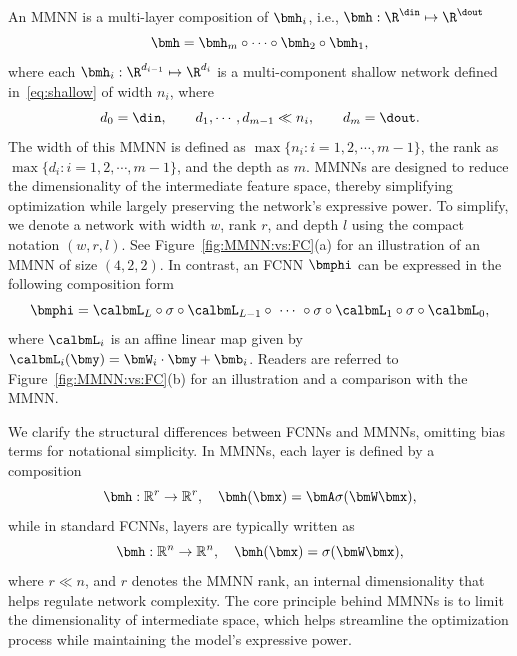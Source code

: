 \documentclass[review,hidelinks,onefignum,onetabnum]{siamart250211}
\begin{document}



An MMNN is a multi-layer composition of $\bmh_i$, i.e., $\bmh:\R^\din \mapsto\R^\dout$
\begin{equation*}
    \bmh=\bmh_m\circ \cdots \circ \bmh_2\circ \bmh_1,
\end{equation*}
where each $\bmh_i:\R^{d_{i-1}}\mapsto\R^{d_{i}}$ is a multi-component shallow network defined in~\eqref{eq:shallow} of width $n_i$, where 
\begin{equation*}
    d_0=\din,\qquad d_1,\cdots, d_{m-1}\ll   n_i,\qquad d_m=\dout.
\end{equation*}
The width of this MMNN is defined as $\max\{n_i: i=1,2,\cdots,m-1\}$, the rank as $\max\{d_i: i=1,2,\cdots,m-1\}$, and the depth as $m$.
MMNNs are designed to reduce the dimensionality of the intermediate feature space, thereby simplifying optimization while largely preserving the network's expressive power.
To simplify, we denote a network with width $w$, rank $r$, and depth $l$ using the compact notation $(w,r,l)$.
See 
Figure~\ref{fig:MMNN:vs:FC}(a)
for an illustration of an MMNN of size $(4,2,2)$.
In contrast, an FCNN $\bmphi$ can be expressed in the following composition form
	\begin{equation*}
		\bmphi =\calbmL_L\circ\sigma\circ
		\calbmL_{L-1}\circ %
		\ \cdots \  \circ 
		\sigma\circ
		\calbmL_1\circ\sigma\circ\calbmL_0,
	\end{equation*}
 where $\calbmL_i$ is an affine linear map given by $\calbmL_i(\bmy)=\bmW_i\cdot \bmy+\bmb_i$. Readers are referred to 
 Figure~\ref{fig:MMNN:vs:FC}(b)
 for an illustration and a comparison with the MMNN.


We clarify the structural differences between FCNNs and MMNNs, omitting bias terms for notational simplicity.
In MMNNs, each layer is defined by a composition
\[
\bmh: \mathbb{R}^r \to \mathbb{R}^r, \quad \bmh(\bmx) = \bmA\sigma(\bmW\bmx),
\]
while in standard FCNNs, layers are typically written as
\[
\bmh: \mathbb{R}^n \to \mathbb{R}^n, \quad \bmh(\bmx) = \sigma(\bmW\bmx),
\]
where \( r \ll n \), and \( r \) denotes the MMNN rank, an internal dimensionality that helps regulate network complexity.
The core principle behind MMNNs is to limit the dimensionality of intermediate space, which helps streamline the optimization process while maintaining the model's expressive power.
\end{document}
